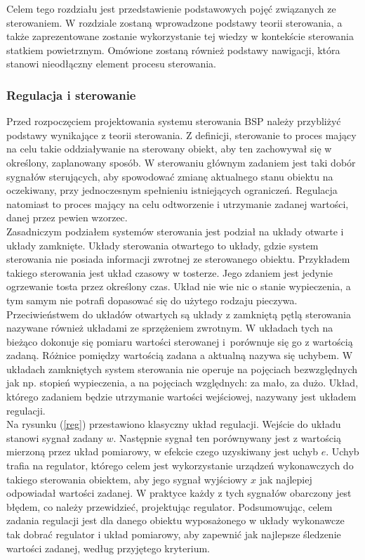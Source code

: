 Celem tego rozdziału jest przedstawienie podstawowych pojęć związanych ze sterowaniem. W rozdziale zostaną wprowadzone podstawy teorii sterowania, a także zaprezentowane zostanie wykorzystanie tej wiedzy w kontekście sterowania statkiem powietrznym. Omówione zostaną również podstawy nawigacji, która stanowi nieodłączny element procesu sterowania.

\subsubsection{Regulacja i sterowanie}

Przed rozpoczęciem projektowania systemu sterowania BSP należy przybliżyć podstawy wynikające z teorii sterowania. Z definicji, sterowanie to proces mający na celu takie oddziaływanie na sterowany obiekt, aby ten zachowywał się w określony, zaplanowany sposób. W sterowaniu głównym zadaniem jest taki dobór sygnałów sterujących, aby spowodować zmianę aktualnego stanu obiektu na oczekiwany, przy jednoczesnym spełnieniu istniejących ograniczeń. Regulacja natomiast to proces mający na celu odtworzenie i utrzymanie zadanej wartości, danej przez pewien wzorzec.\\

Zasadniczym podziałem systemów sterowania jest podział na układy otwarte i układy zamknięte. Układy sterowania otwartego to układy, gdzie system sterowania nie posiada informacji zwrotnej ze sterowanego obiektu. Przykładem takiego sterowania jest układ czasowy w tosterze. Jego zdaniem jest jedynie ogrzewanie tosta przez określony czas. Układ nie wie nic o stanie wypieczenia, a tym samym nie potrafi dopasować się do użytego rodzaju pieczywa. Przeciwieństwem do układów otwartych są układy z zamkniętą pętlą sterowania nazywane również układami ze sprzężeniem zwrotnym. W układach tych na bieżąco dokonuje się pomiaru wartości sterowanej i~porównuje się go z wartością zadaną. Różnice pomiędzy wartością zadana a aktualną nazywa się uchybem. W układach zamkniętych system sterowania nie operuje na pojęciach bezwzględnych jak np. stopień wypieczenia, a na pojęciach względnych: za mało, za dużo. Układ, którego zadaniem będzie utrzymanie wartości wejściowej, nazywany jest układem regulacji.\\

Na rysunku (\ref{reg}) przestawiono klasyczny układ regulacji.  Wejście do układu stanowi sygnał zadany $w$. Następnie sygnał ten porównywany jest z wartością mierzoną przez układ pomiarowy, w efekcie czego uzyskiwany jest uchyb $e$. Uchyb trafia na regulator, którego celem jest wykorzystanie urządzeń wykonawczych do takiego sterowania obiektem, aby jego sygnał wyjściowy $x$ jak najlepiej odpowiadał wartości zadanej. W praktyce każdy z tych sygnałów obarczony jest błędem, co należy przewidzieć, projektując regulator. Podsumowując, celem zadania regulacji jest dla danego obiektu wyposażonego w układy wykonawcze tak dobrać regulator i układ pomiarowy, aby zapewnić jak najlepsze śledzenie wartości zadanej, według przyjętego kryterium.


